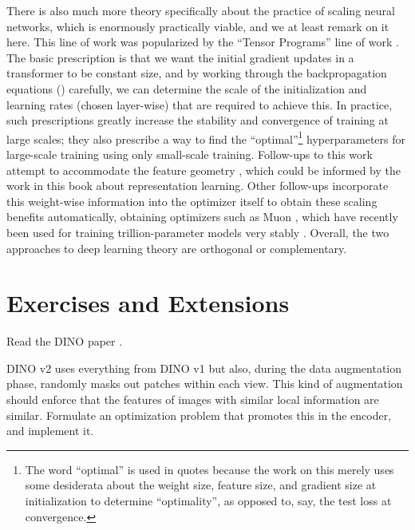 \documentclass[../../book-main.tex]{subfiles}
\begin{document}
There is also much more theory specifically about the practice of scaling neural networks, which is enormously practically viable, and we at least remark on it here. This line of work was popularized by the ``Tensor Programs'' line of work \citep{yang2022tensor}. The basic prescription is that we want the initial gradient updates in a transformer to be constant size, and by working through the backpropagation equations () carefully, we can determine the scale of the initialization and learning rates (chosen layer-wise) that are required to achieve this. In practice, such prescriptions greatly increase the stability and convergence of training at large scales; they also prescribe a way to find the ``optimal''\footnote{The word ``optimal'' is used in quotes because the work on this merely uses some desiderata about the weight size, feature size, and gradient size at initialization to determine ``optimality'', as opposed to, say, the test loss at convergence.} hyperparameters for large-scale training using only small-scale training. Follow-ups to this work attempt to accommodate the feature geometry \citep{bernstein2024oldoptimizernewnorm}, which could be informed by the work in this book about representation learning. Other follow-ups incorporate this weight-wise information into the optimizer itself to obtain these scaling benefits automatically, obtaining optimizers such as Muon \citep{jordan6muon}, which have recently been used for training trillion-parameter models very stably \citep{moonshot2025kimi}. Overall, the two approaches to deep learning theory are orthogonal or complementary.


\section{Exercises and Extensions}

\begin{exercise}
    Read the DINO paper \cite{caron2021emerging}.
\end{exercise}

\begin{exercise}
    DINO v2 \cite{oquab2023dinov2} uses everything from DINO v1 but also, during the data augmentation phase, randomly masks out patches within each view. This kind of augmentation should enforce that the features of images with similar local information are similar. Formulate an optimization problem that promotes this in the encoder, and implement it.
\end{exercise}
\end{document}
